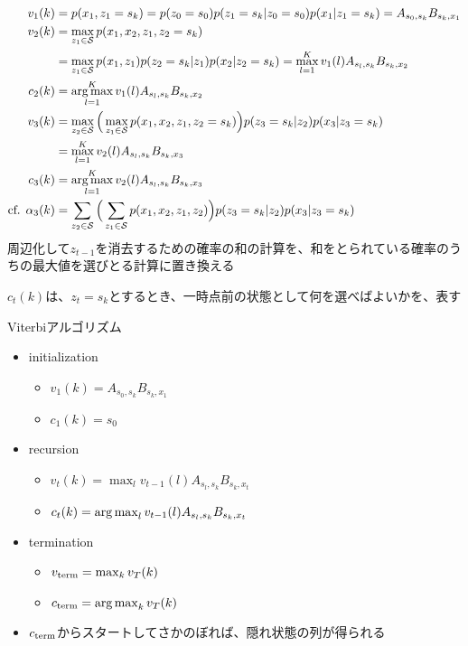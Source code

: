 \documentclass[aspectratio=169,unicode,dvipdfmx,14pt]{beamer}
\begin{document}
\begin{frame}
\FontMath
\vspace{-.2in}
\begin{align}
v_1(k) & = p(x_1,z_1=s_k) = p(z_0=s_0)p(z_1=s_k|z_0=s_0)p(x_1|z_1=s_k) = A_{s_0,s_k} B_{s_k,x_1}
\notag \\ 
v_2(k) & = \max_{z_1 \in \mathcal{S}} p(x_1,x_2, z_1, z_2=s_k)
\notag \\ &
= \max_{z_1 \in \mathcal{S}} p(x_1,z_1) p(z_2=s_k|z_1) p(x_2|z_2=s_k)
= \max_{l=1}^K v_1(l) A_{s_l,s_k} B_{s_k, x_2}
\label{eq:v_2_2} \\
c_2(k) & = \operatorname*{arg\,max}_{l=1}^K v_1(l) A_{s_l,s_k} B_{s_k, x_2}
\\
v_3(k) & = \max_{z_2 \in \mathcal{S}} 
\Big( \max_{z_1 \in \mathcal{S}} p(x_1,x_2, z_1, z_2=s_k) \Big)
p(z_3=s_k|z_2) p(x_3|z_3=s_k)
\notag \\ &
= \max_{l=1}^K v_2(l) A_{s_l,s_k} B_{s_k, x_3}
\\
c_3(k) & = \operatorname*{arg\,max}_{l=1}^K v_2(l) A_{s_l,s_k} B_{s_k, x_3}
\\
\mbox{cf. } 
\alpha_3(k) & = \sum_{z_2 \in \mathcal{S}} 
\Big( \sum_{z_1 \in \mathcal{S}} p(x_1, x_2, z_1,z_2) \Big)
p(z_3=s_k|z_2) p(x_3|z_3=s_k)
\label{eq:v_3_2} 
\end{align}
周辺化して$z_{t-1}$を消去するための確率の和の計算を、和をとられている確率のうちの最大値を選びとる計算に置き換える

$c_t(k)$は、$z_t=s_k$とするとき、一時点前の状態として何を選べばよいかを、表す
\end{frame}

\begin{frame}{Viterbiアルゴリズム}
\FontMath
\begin{itemize}
\item initialization
\begin{itemize}
\item $v_1(k) = A_{s_0,s_k} B_{s_k,x_1}$
\item $c_1(k) = s_0$
\end{itemize}
\item recursion
\begin{itemize}
\item $v_t(k) = \max_l v_{t-1}(l) A_{s_l,s_k} B_{s_k, x_t}$
\item $c_t(k) = \operatorname*{arg\,max}_l v_{t-1}(l) A_{s_l,s_k} B_{s_k, x_t}$
\end{itemize}
\item termination
\begin{itemize}
\item $v_{\mbox{\scriptsize term}} = \max_k v_T(k)$
\item $c_{\mbox{\scriptsize term}} = \operatorname*{arg\,max}_k v_T(k)$
\end{itemize}
\item $c_{\mbox{\scriptsize term}}$からスタートしてさかのぼれば、隠れ状態の列が得られる
\end{itemize}
\end{frame}
\end{document}
